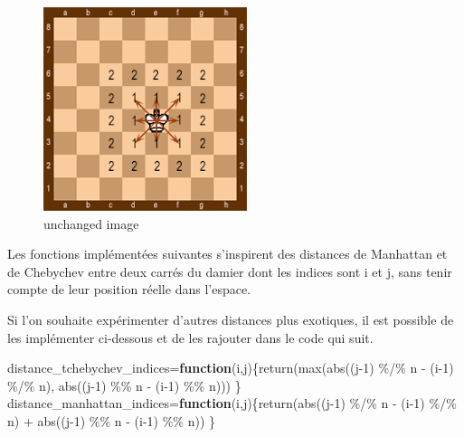 \documentclass[
]{article}
\newenvironment{Shaded}{\begin{snugshade}}{\end{snugshade}}
\newcommand{\ControlFlowTok}[1]{\textcolor[rgb]{0.13,0.29,0.53}{\textbf{#1}}}
\newcommand{\DecValTok}[1]{\textcolor[rgb]{0.00,0.00,0.81}{#1}}
\newcommand{\FunctionTok}[1]{\textcolor[rgb]{0.00,0.00,0.00}{#1}}
\newcommand{\NormalTok}[1]{#1}
\newcommand{\OtherTok}[1]{\textcolor[rgb]{0.56,0.35,0.01}{#1}}
\newcommand{\SpecialCharTok}[1]{\textcolor[rgb]{0.00,0.00,0.00}{#1}}
\begin{document}
\begin{figure}
\centering
\includegraphics{Templates/chebychev.png}
\caption{unchanged image}
\end{figure}

Les fonctions implémentées suivantes s'inspirent des distances de
Manhattan et de Chebychev entre deux carrés du damier dont les indices
sont i et j, sans tenir compte de leur position réelle dans l'espace.

Si l'on souhaite expérimenter d'autres distances plus exotiques, il est
possible de les implémenter ci-dessous et de les rajouter dans le code
qui suit.

\begin{Shaded}
\begin{Highlighting}[]
\NormalTok{distance\_tchebychev\_indices}\OtherTok{=}\ControlFlowTok{function}\NormalTok{(i,j)\{}\FunctionTok{return}\NormalTok{(}\FunctionTok{max}\NormalTok{(}\FunctionTok{abs}\NormalTok{((j}\DecValTok{{-}1}\NormalTok{) }\SpecialCharTok{\%/\%}\NormalTok{ n }\SpecialCharTok{{-}}\NormalTok{ (i}\DecValTok{{-}1}\NormalTok{) }\SpecialCharTok{\%/\%}\NormalTok{ n), }\FunctionTok{abs}\NormalTok{((j}\DecValTok{{-}1}\NormalTok{) }\SpecialCharTok{\%\%}\NormalTok{ n }\SpecialCharTok{{-}}\NormalTok{ (i}\DecValTok{{-}1}\NormalTok{) }\SpecialCharTok{\%\%}\NormalTok{ n))) \}}
\NormalTok{distance\_manhattan\_indices}\OtherTok{=}\ControlFlowTok{function}\NormalTok{(i,j)\{}\FunctionTok{return}\NormalTok{(}\FunctionTok{abs}\NormalTok{((j}\DecValTok{{-}1}\NormalTok{) }\SpecialCharTok{\%/\%}\NormalTok{ n }\SpecialCharTok{{-}}\NormalTok{ (i}\DecValTok{{-}1}\NormalTok{) }\SpecialCharTok{\%/\%}\NormalTok{ n) }\SpecialCharTok{+} \FunctionTok{abs}\NormalTok{((j}\DecValTok{{-}1}\NormalTok{) }\SpecialCharTok{\%\%}\NormalTok{ n }\SpecialCharTok{{-}}\NormalTok{ (i}\DecValTok{{-}1}\NormalTok{) }\SpecialCharTok{\%\%}\NormalTok{ n)) \}}
\end{Highlighting}
\end{Shaded}
\end{document}
